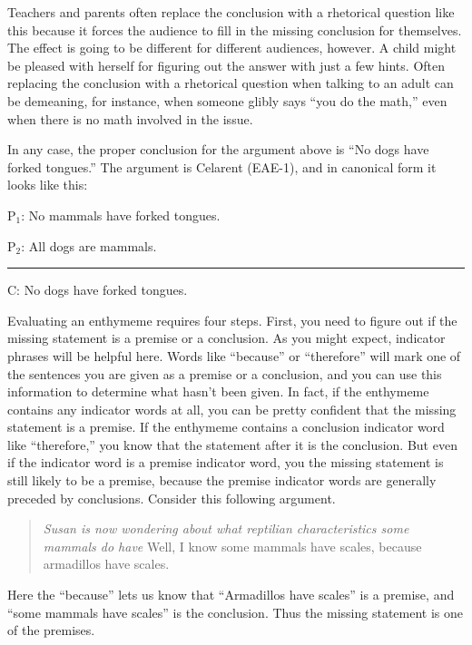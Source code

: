 Teachers and parents often replace the conclusion with a rhetorical question like this because it forces the audience to fill in the missing conclusion for themselves. The effect is going to be different for different audiences, however. A child might be pleased with herself for figuring out the answer with just a few hints. Often replacing the conclusion with a rhetorical question when talking to an adult can be demeaning, for instance, when someone glibly says ``you do the math,'' even when there is no math involved in the issue. 

In any case, the proper conclusion for the argument above is ``No dogs have forked tongues.'' The argument is Celarent (EAE-1), and in canonical form it looks like this: 

\begin{earg}
\item[P$_1$:] No mammals have forked tongues.
\item[P$_2$:] All dogs are mammals.
\vspace{-.5em}
\item [] \rule{0.4\linewidth}{.5pt} 
\item[C:] No dogs have forked tongues. 
\end{earg} 


Evaluating an enthymeme requires four steps. First, you need to figure out if the missing statement is a premise or a conclusion. As you might expect, indicator phrases will be helpful here. Words like ``because'' or ``therefore'' will mark one of the sentences you are given as a premise or a conclusion, and you can use this information to determine what hasn't been given. In fact, if the enthymeme contains any indicator words at all, you can be pretty confident that the missing statement is a premise. If the enthymeme contains a conclusion indicator word like ``therefore,'' you know that the statement after it is the conclusion. But even if the indicator word is a premise indicator word, you the missing statement is still likely to be a premise, because the premise indicator words are generally preceded by conclusions. Consider this following argument. 

\begin{quotation} \noindent\textit{Susan is now wondering about what reptilian characteristics some mammals do have} Well, I know some mammals have scales, because armadillos have scales. \end{quotation}

 Here the ``because'' lets us know that  ``Armadillos have scales'' is a premise, and ``some mammals have scales'' is the conclusion. Thus the missing statement is one of the premises. 

